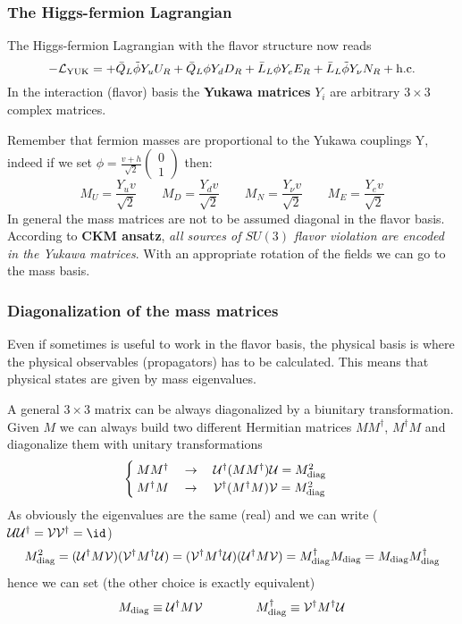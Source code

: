 \documentclass[TheoreticalPhy_ModB.tex]{subfiles}
\begin{document}
\subsubsection{The Higgs-fermion Lagrangian}

The Higgs-fermion Lagrangian with the flavor structure now reads
\[-\mathcal L_{\text{YUK}}=+\bar Q_L\tilde\phi Y_uU_R+\bar Q_L\phi Y_dD_R+\bar L_L\phi Y_eE_R+\bar L_L\tilde\phi Y_\nu N_R+\text{h.c.}\]
In the interaction (flavor) basis the \textbf{Yukawa matrices} $Y_i$ are arbitrary $3\times 3$ complex matrices.

Remember that fermion masses are proportional to the Yukawa couplings Y, indeed if we set $\phi=\frac{v+h}{\sqrt2}\begin{pmatrix}0\\1\end{pmatrix}$ then:
\[M_U=\frac{Y_uv}{\sqrt2}\qquad M_D=\frac{Y_dv}{\sqrt2}\qquad M_N=\frac{Y_\nu v}{\sqrt2}\qquad M_E=\frac{Y_ev}{\sqrt2}\]
In general the mass matrices are not to be assumed diagonal in the flavor basis. According to \textbf{CKM ansatz}, \textit{all sources of $SU(3)$ flavor violation are encoded in the Yukawa matrices}. With an appropriate rotation of the fields we can go to the mass basis. 

\subsubsection{Diagonalization of the mass matrices}

Even if sometimes is useful to work in the flavor basis, the physical basis is where the physical observables (propagators) has to be calculated. This means that physical states are given by mass eigenvalues. 

A general $3\times 3$ matrix can be always diagonalized by a biunitary transformation. Given $M$ we can always build two different Hermitian matrices $MM^\dagger$, $M^\dagger M$ and diagonalize them with unitary transformations
\[\begin{cases}
MM^\dagger\quad\to\quad \mathcal U^\dagger(MM^\dagger)\mathcal U=M^2_{\text{diag}}\\
M^\dagger M\quad\to\quad \mathcal V^\dagger(M^\dagger M)\mathcal V=M^2_{\text{diag}}
\end{cases}\]
As obviously the eigenvalues are the same (real) and we can write ($\mcu\mcu^\dagger=\mcv\mcv^\dagger=\id$)
\[M^2_{\text{diag}}=(\mathcal U^\dagger M \mathcal V)(\mathcal V^\dagger M^\dagger \mathcal U)=(\mathcal V^\dagger M^\dagger \mathcal U)(\mathcal U^\dagger M \mathcal V)=M_{\text{diag}}^\dagger M_{\text{diag}}=M_{\text{diag}}M_{\text{diag}}^\dagger\]
hence we can set (the other choice is exactly equivalent)
\[M_{\text{diag}}\equiv \mathcal U^\dagger M \mathcal V\hspace{1.5cm}M_{\text{diag}}^\dagger\equiv\mathcal V^\dagger M^\dagger \mathcal U\]
\end{document}
